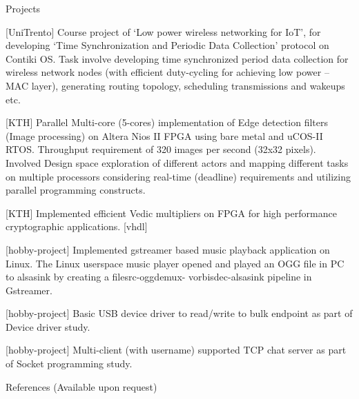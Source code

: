 \documentclass[
	a4paper, %
	11pt, %
]{resume} %
\begin{document}
\begin{rSection}{Projects}

        \item {[UniTrento]} Course project of ‘Low power wireless networking for IoT’, for developing ‘Time Synchronization and Periodic Data Collection’ protocol on Contiki OS. Task involve developing time synchronized period data collection for wireless network nodes (with efficient duty-cycling for achieving low power – MAC layer), generating routing topology, scheduling transmissions and wakeups etc.
        \item {[KTH]} Parallel Multi-core (5-cores) implementation of Edge detection filters (Image processing) on Altera Nios II FPGA using bare metal and uCOS-II RTOS. Throughput requirement of 320 images per second (32x32 pixels). Involved Design space exploration of different actors and mapping different tasks on multiple processors considering real-time (deadline) requirements and utilizing parallel programming constructs.
        \item {[KTH]} Implemented efficient Vedic multipliers on FPGA for high performance cryptographic applications. {[vhdl]}
        \item {[hobby-project]} Implemented gstreamer based music playback application on Linux. The Linux userspace music player opened and played an OGG file in PC to alsasink by creating a filesrc-oggdemux- vorbisdec-alsasink pipeline in Gstreamer.
        \item {[hobby-project]} Basic USB device driver to read/write to bulk endpoint as part of Device driver study.
        \item {[hobby-project]} Multi-client (with username) supported TCP chat server as part of Socket programming study.

\end{rSection}



\begin{rSection}{References}
\centering (Available upon request)

\end{rSection}

\end{document}
